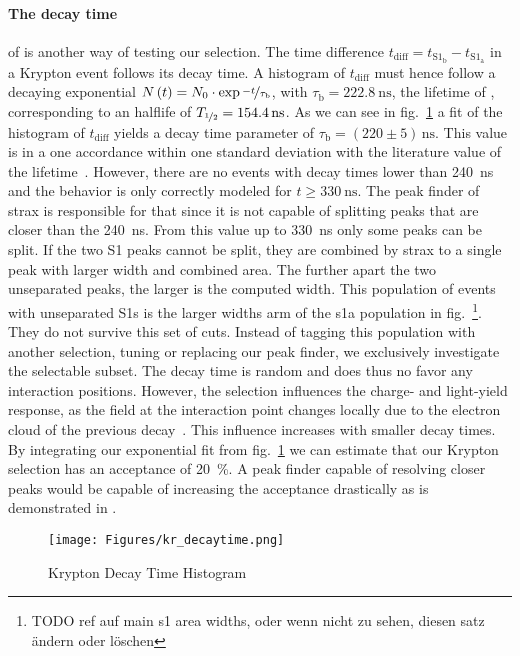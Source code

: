 \paragraph{The decay time} of  is another way of testing our selection.
The time difference $ t_\mathrm{diff} = t_{\mathrm{S}1_\mathrm{b}} - t_{\mathrm{S}1_\mathrm{a}} $ in a Krypton event follows its decay time.
A histogram of $ t_\mathrm{diff} $ must hence follow a decaying exponential $ N \left( t \right) = N_0 \cdot \exp{\nicefrac{-t}{\tau_\mathrm{b}}} $, with $ \tau_\mathrm{b} = \SI{222.8}{\nano\s} $, the lifetime of , corresponding to an halflife of $ T_{\nicefrac{1}{2}} = 154.4\,\mathrm{ns} $.
As we can see in fig.~\ref{fig:kr-decaytime} a fit of the histogram of $ t_\mathrm{diff} $ yields a decay time parameter of $ \tau_\mathrm{b} = (220 \pm 5)\,\mathrm{ns} $.
This value is in a one accordance within one standard deviation with the literature value of the lifetime~\cite{?}.  %
However, there are no events with decay times lower than \SI{240}{\nano\s} and the behavior is only correctly modeled for $ t \ge \SI{330}{\nano\s} $.
The peak finder of strax is responsible for that since it is not capable of splitting peaks that are closer than the \SI{240}{\nano\s}.
From this value up to \SI{330}{\nano\s} only some peaks can be split.
If the two S1 peaks cannot be split, they are combined by strax to a single peak with larger width and combined area.
The further apart the two unseparated peaks, the larger is the computed width.
This population of events with unseparated S1s is the larger widths arm of the \gls{s1a} population in fig.~\footnote{TODO ref auf main s1 area widths, oder wenn nicht zu sehen, diesen satz ändern oder löschen}.
They do not survive this set of cuts.
Instead of tagging this population with another selection, tuning or replacing our peak finder, we exclusively investigate the selectable subset.
The decay time is random and does thus no favor any interaction positions.
However, the selection influences the charge- and light-yield response, as the field at the interaction point changes locally due to the electron cloud of the previous decay~\cite{Baudis2013}.
This influence increases with smaller decay times.
By integrating our exponential fit from fig.~\ref{fig:kr-decaytime} we can estimate that our Krypton selection has an acceptance of \SI{20}{\%}.
A peak finder capable of resolving closer peaks would be capable of increasing the acceptance drastically as is demonstrated in \cite{PMeinhardt}.


\begin{figure}
\centering
\texttt{[image: Figures/kr\_decaytime.png]}  %
\caption[Krypton Decay Time Histogram]{
    Krypton Decay Time Histogram
    }
\label{fig:kr-decaytime}
\end{figure}



\FloatBarrier

